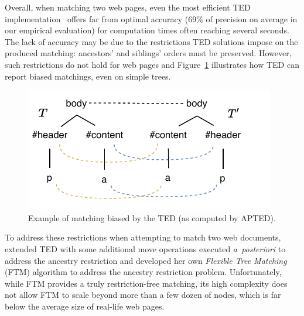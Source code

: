 Overall, when matching two web pages, even the most efficient TED implementation~\cite{pawlik2016tree} offers far from optimal accuracy (69\% of precision on average in our empirical evaluation) for computation times often reaching several seconds.
The lack of accuracy may be due to the restrictions TED solutions impose on the produced matching: ancestors' and siblings' orders must be preserved.
However, such restrictions do not hold for web pages and Figure~\ref{sftm:fig:ted_mistake} illustrates how TED can report biased matchings, even on simple trees.

\begin{figure}
    \centering
	\includegraphics[width=.65\linewidth]{tree-matching/explanation/rted_mistake}
    \caption{Example of matching biased by the TED (as computed by APTED).}
    \label{sftm:fig:ted_mistake}
\end{figure}

To address these restrictions when attempting to match two web documents, \cite{fokaefs2011empirical} extended TED with some additional move operations executed \emph{a~posteriori} to address the ancestry restriction and \cite{Kumar2011_FTM,Kumar2011_Bricolage} developed her own \emph{Flexible Tree Matching} (FTM) algorithm to address the ancestry restriction problem.
Unfortunately, while FTM provides a truly restriction-free matching, its high complexity does not allow FTM to scale beyond more than a few dozen of nodes, which is far below the average size of real-life web pages.



